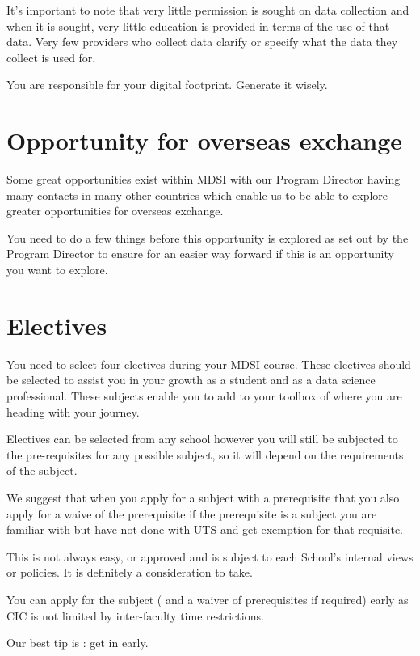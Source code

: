 \documentclass[]{book}
\theoremstyle{definition}
\theoremstyle{definition}
\theoremstyle{remark}
\begin{document}
It's important to note that very little permission is sought on data
collection and when it is sought, very little education is provided in
terms of the use of that data. Very few providers who collect data
clarify or specify what the data they collect is used for.

You are responsible for your digital footprint. Generate it wisely.

\section{Opportunity for overseas
exchange}\label{opportunity-for-overseas-exchange}

Some great opportunities exist within MDSI with our Program Director
having many contacts in many other countries which enable us to be able
to explore greater opportunities for overseas exchange.

You need to do a few things before this opportunity is explored as set
out by the Program Director to ensure for an easier way forward if this
is an opportunity you want to explore.

\section{Electives}\label{electives}

You need to select four electives during your MDSI course. These
electives should be selected to assist you in your growth as a student
and as a data science professional. These subjects enable you to add to
your toolbox of where you are heading with your journey.

Electives can be selected from any school however you will still be
subjected to the pre-requisites for any possible subject, so it will
depend on the requirements of the subject.

We suggest that when you apply for a subject with a prerequisite that
you also apply for a waive of the prerequisite if the prerequisite is a
subject you are familiar with but have not done with UTS and get
exemption for that requisite.

This is not always easy, or approved and is subject to each School's
internal views or policies. It is definitely a consideration to take.

You can apply for the subject ( and a waiver of prerequisites if
required) early as CIC is not limited by inter-faculty time
restrictions.

Our best tip is : get in early.
\end{document}
